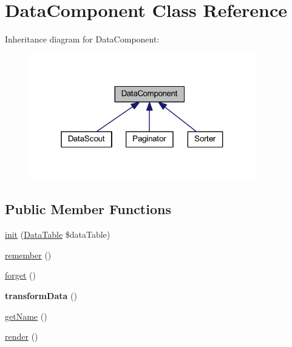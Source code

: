 \hypertarget{classhamburgscleanest_1_1_data_tables_1_1_models_1_1_data_component}{}\section{Data\+Component Class Reference}
\label{classhamburgscleanest_1_1_data_tables_1_1_models_1_1_data_component}


Inheritance diagram for Data\+Component\+:\nopagebreak
\begin{figure}[H]
\begin{center}
\leavevmode
\includegraphics[width=280pt]{classhamburgscleanest_1_1_data_tables_1_1_models_1_1_data_component__inherit__graph}
\end{center}
\end{figure}
\subsection*{Public Member Functions}
\begin{DoxyCompactItemize}
\item 
\hyperlink{classhamburgscleanest_1_1_data_tables_1_1_models_1_1_data_component_a69c14abc547575170f5c45a94c58ac8a}{init} (\hyperlink{classhamburgscleanest_1_1_data_tables_1_1_models_1_1_data_table}{Data\+Table} \$data\+Table)
\item 
\hyperlink{classhamburgscleanest_1_1_data_tables_1_1_models_1_1_data_component_a565ac6563f3548952f5b3b9807799d17}{remember} ()
\item 
\hyperlink{classhamburgscleanest_1_1_data_tables_1_1_models_1_1_data_component_a5fd46320a3fc88f4322cbb025eab7cba}{forget} ()
\item 
\mbox{\label{classhamburgscleanest_1_1_data_tables_1_1_models_1_1_data_component_a18e1ad2a8fdb81acfc1d88c1efef5f4a}} 
{\bfseries transform\+Data} ()
\item 
\hyperlink{classhamburgscleanest_1_1_data_tables_1_1_models_1_1_data_component_a3d0963e68bb313b163a73f2803c64600}{get\+Name} ()
\item 
\hyperlink{classhamburgscleanest_1_1_data_tables_1_1_models_1_1_data_component_afde88292c44dc59faf017738dae6dffb}{render} ()
\end{DoxyCompactItemize}
